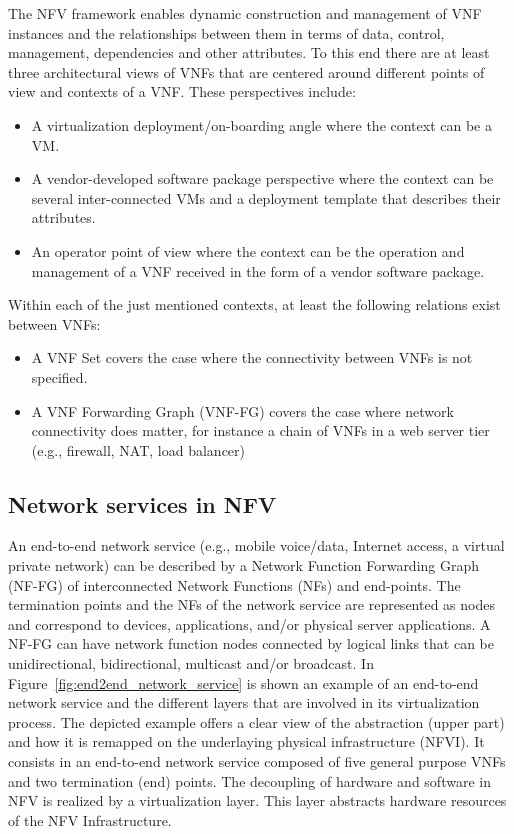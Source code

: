 The NFV framework enables dynamic construction and management of VNF instances and the relationships between them in terms of data, control, management, dependencies and other attributes. To this end there are at least three architectural views of VNFs that are centered around different points of view and contexts of a VNF. These perspectives include:
\begin{itemize}
	\item A virtualization deployment/on-boarding angle where the context can be a VM.
	\item A vendor-developed software package perspective where the context can be several inter-connected VMs and a deployment template that describes their attributes.
	\item An operator point of view where the context can be the operation and management of a VNF received in the form of a vendor software package.
\end{itemize}
Within each of the just mentioned contexts, at least the following relations exist between VNFs:
\begin{itemize}
	\item A VNF Set covers the case where the connectivity between VNFs is not specified.
	\item A VNF Forwarding Graph (VNF-FG) covers the case where network connectivity does matter, for instance a chain of VNFs in a web server tier (e.g., firewall, NAT, load balancer)
\end{itemize}

\subsection{Network services in NFV}
An end-to-end network service (e.g., mobile voice/data, Internet access, a virtual private network) can be described by a Network Function Forwarding Graph (NF-FG) of interconnected Network Functions (NFs) and end-points. The termination points and the NFs of the network service are represented as nodes and correspond to devices, applications, and/or physical server applications. A NF-FG can have network function nodes connected by logical links that can be unidirectional, bidirectional, multicast and/or broadcast.
In Figure~\ref{fig:end2end_network_service} is shown an example of an end-to-end network service and the different layers that are involved in its virtualization process. The depicted example offers a clear view of the abstraction (upper part) and how it is remapped on the underlaying physical infrastructure (NFVI). It consists in an end-to-end network service composed of five general purpose VNFs and two termination (end) points. The decoupling of hardware and software in NFV is realized by a virtualization layer. This layer abstracts hardware resources of the NFV Infrastructure.

